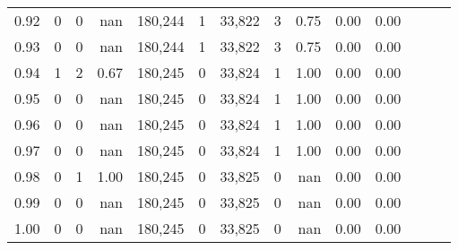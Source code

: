 \begin{tabular}{rrrrrrrrrrrrrr}
0.92 &      0 &      0 &   nan &  180,244 &        1 &  33,822 &       3 &  0.75 &  0.00 &      0.00 \\
0.93 &      0 &      0 &   nan &  180,244 &        1 &  33,822 &       3 &  0.75 &  0.00 &      0.00 \\
0.94 &      1 &      2 &  0.67 &  180,245 &        0 &  33,824 &       1 &  1.00 &  0.00 &      0.00 \\
0.95 &      0 &      0 &   nan &  180,245 &        0 &  33,824 &       1 &  1.00 &  0.00 &      0.00 \\
0.96 &      0 &      0 &   nan &  180,245 &        0 &  33,824 &       1 &  1.00 &  0.00 &      0.00 \\
0.97 &      0 &      0 &   nan &  180,245 &        0 &  33,824 &       1 &  1.00 &  0.00 &      0.00 \\
0.98 &      0 &      1 &  1.00 &  180,245 &        0 &  33,825 &       0 &   nan &  0.00 &      0.00 \\
0.99 &      0 &      0 &   nan &  180,245 &        0 &  33,825 &       0 &   nan &  0.00 &      0.00 \\
1.00 &      0 &      0 &   nan &  180,245 &        0 &  33,825 &       0 &   nan &  0.00 &      0.00 \\
\bottomrule
\end{tabular}
